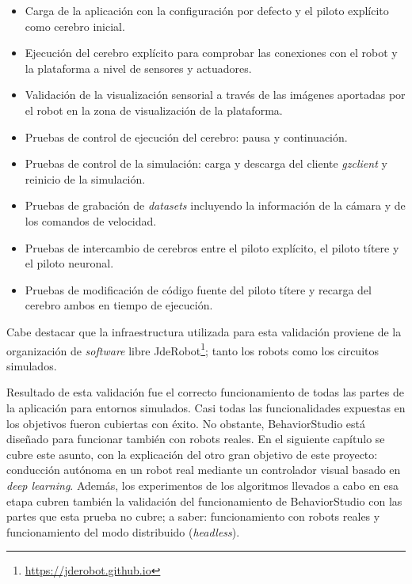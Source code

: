 \begin{itemize}
    \item Carga de la aplicación con la configuración por defecto y el piloto explícito como cerebro inicial. \checkmark
    \item Ejecución del cerebro explícito para comprobar las conexiones con el robot y la plataforma a nivel de sensores y actuadores. \checkmark
    \item Validación de la visualización sensorial a través de las imágenes aportadas por el robot en la zona de visualización de la plataforma. \checkmark
    \item Pruebas de control de ejecución del cerebro: pausa y continuación. \checkmark
    \item Pruebas de control de la simulación: carga y descarga del cliente \textit{gzclient} y reinicio de la simulación. \checkmark
    \item Pruebas de grabación de \textit{datasets} incluyendo la información de la cámara y de los comandos de velocidad. \checkmark
    \item Pruebas de intercambio de cerebros entre el piloto explícito, el piloto títere y el piloto neuronal. \checkmark
    \item Pruebas de modificación de código fuente del piloto títere y recarga del cerebro ambos en tiempo de ejecución. \checkmark
\end{itemize}

Cabe destacar que la infraestructura utilizada para esta validación proviene de la organización de \textit{software} libre JdeRobot\footnote{\url{https://jderobot.github.io}}; tanto los robots como los circuitos simulados.

Resultado de esta validación fue el correcto funcionamiento de todas las partes de la aplicación para entornos simulados. Casi todas las funcionalidades expuestas en los objetivos fueron cubiertas con éxito. No obstante, BehaviorStudio está diseñado para funcionar también con robots reales. En el siguiente capítulo se cubre este asunto, con la explicación del otro gran objetivo de este proyecto: conducción autónoma en un robot real mediante un controlador visual basado en \textit{deep learning}. Además, los experimentos de los algoritmos llevados a cabo en esa etapa cubren también la validación del funcionamiento de BehaviorStudio con las partes que esta prueba no cubre; a saber: funcionamiento con robots reales y funcionamiento del modo distribuido (\textit{headless}).
